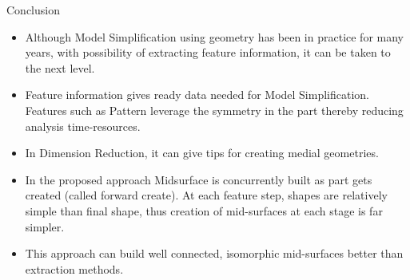 \begin{frame}[<+-| alert@+>]{Conclusion}
\begin{itemize}[noitemsep,label=\textbullet,topsep=2pt,parsep=2pt,partopsep=2pt]
\item Although Model Simplification using geometry has been in practice for many years, with possibility of extracting feature information, it can be taken to the next level. 
\item Feature information gives ready data needed for Model Simplification.  Features such as Pattern leverage the symmetry in the part thereby reducing analysis time-resources. 
\item In Dimension Reduction, it can give tips for creating medial geometries.
\item In the proposed approach Midsurface is concurrently built as part gets created (called forward create). At each feature step, shapes are relatively simple than final shape, thus creation of mid-surfaces at each stage is far simpler. 
\item This approach can build well connected, isomorphic mid-surfaces better than extraction methods. 
\end{itemize}


\end{frame}

